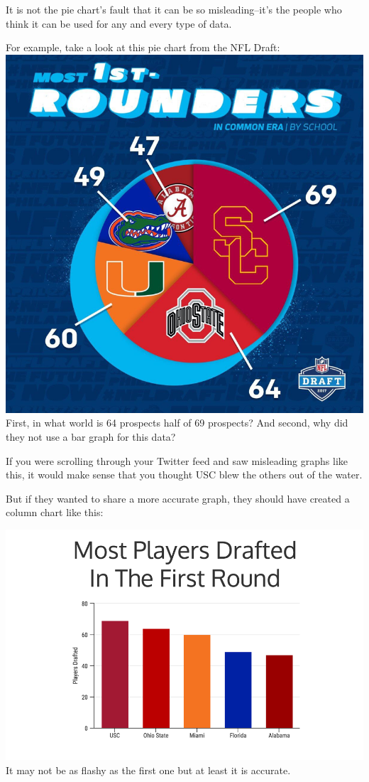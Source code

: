 \documentclass[]{book}
\theoremstyle{definition}
\theoremstyle{definition}
\theoremstyle{definition}
\theoremstyle{remark}
\begin{document}
It is not the pie chart's fault that it can be so misleading--it's the
people who think it can be used for any and every type of data.

For example, take a look at this pie chart from the NFL Draft:
\includegraphics{images/4.misleading-graphs-17.png} First, in what world
is 64 prospects half of 69 prospects? And second, why did they not use a
bar graph for this data?

If you were scrolling through your Twitter feed and saw misleading
graphs like this, it would make sense that you thought USC blew the
others out of the water.

But if they wanted to share a more accurate graph, they should have
created a column chart like this:

\includegraphics{images/4.misleading-graphs-18.png} It may not be as
flashy as the first one but at least it is accurate.
\end{document}
